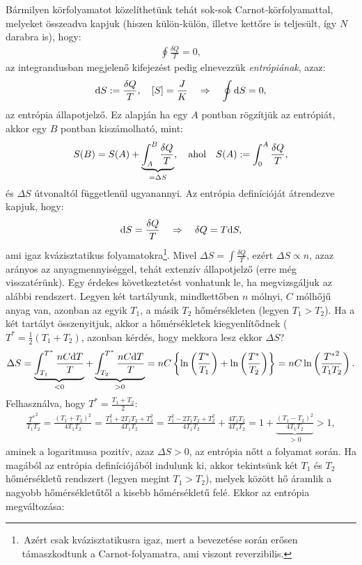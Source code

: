 Bármilyen körfolyamatot közelíthetünk tehát sok-sok Carnot-körfolyamattal, melyeket összeadva kapjuk (hiszen külön-külön, illetve kettőre is teljesült, így $N$ darabra is), hogy:
\begin{align}
	\oint \frac{\delta Q}{T} = 0,
\end{align}
az integrandusban megjelenő kifejezést pedig elnevezzük \emph{entrópiának}, azaz:
\begin{align}
	\mathrm{d}S:= \frac{\delta Q}{T}, \quad [S]=\frac JK \quad\Rightarrow\quad \oint \mathrm{d}S = 0,
\end{align}
az entrópia állapotjelző. Ez alapján ha egy $A$ pontban rögzítjük az entrópiát, akkor egy $B$ pontban kiszámolható, mint:
\begin{align}
	S(B) = S(A) + \underbrace{\int_A^B\frac{\delta Q}{T}}_{=\Delta S},\quad\textnormal{ahol}\quad S(A):=\int_0^A\dfrac{\delta Q}{T},
\end{align}
és $\Delta S$ útvonaltól függetlenül ugyanannyi. Az entrópia definícióját átrendezve kapjuk, hogy:
\begin{align}
	\mathrm{d}S = \frac{\delta Q}{T} \quad\Rightarrow\quad \delta Q = T\mathrm{d}S,
\end{align}
ami igaz kvázisztatikus folyamatokra\footnote{\,Azért csak kvázisztatikusra igaz, mert a bevezetése során erősen támaszkodtunk a Carnot-folyamatra, ami viszont reverzibilis.}. Mivel $\Delta S = \int \frac{\delta Q}{T}$, ezért $\Delta S \propto n$, azaz arányos az anyagmennyiséggel, tehát extenzív állapotjelző (erre még visszatérünk).
Egy érdekes következtetést vonhatunk le, ha megvizsgáljuk az alábbi rendszert. Legyen két tartályunk, mindkettőben $n$ mólnyi, $C$ mólhőjű anyag van, azonban az egyik $T_1$, a másik $T_2$ hőmérsékleten (legyen $T_1>T_2$). Ha a két tartályt összenyitjuk, akkor a hőmérsékletek kiegyenlítődnek ($T^* = \frac 12(T_1+T_2)$, azonban kérdés, hogy mekkora lesz ekkor $\Delta S$?
\begin{align}
	\Delta S = \underbrace{\int_{T_1}^{T^*}\frac{nC\mathrm{d}T}{T}}_{<0} + \underbrace{\int_{T_2}^{T^*}\frac{nC\mathrm{d}T}{T}}_{>0} = nC\left\{{\ln\left({\frac{T^*}{T_1}}\right)+\ln\left({\frac{T^*}{T_2}}\right)}\right\} = nC\ln\left({\frac{{T^*}^2}{T_1T_2}}\right).
\end{align}
Felhasználva, hogy $T^* = \frac{T_1+T_2}{2}$:
\begin{align}
	\frac{{T^*}^2}{T_1T_2}=\frac{(T_1{+}T_2)^2}{4T_1T_2} {=} \frac{T_1^2{+}2T_1T_2{+}T_2^2}{4T_1T_2} {=} \frac{T_1^2{-}2T_1T_2{+}T_2^2}{4T_1T_2} {+} \frac{4T_1T_2}{4T_1T_2} {=} 1{+}\underbrace{\frac{(T_1{-}T_2)^2}{4T_1T_2}}_{>0}>1,
\end{align}
aminek a logaritmusa pozitív, azaz $\Delta S>0$, az entrópia nőtt a folyamat során. Ha magából az entrópia definíciójából indulunk ki, akkor tekintsünk két $T_1$ és $T_2$ hőmérsékletű rendszert (legyen megint $T_1>T_2$), melyek között hő áramlik a nagyobb hőmérsékletűtől a kisebb hőmérsékletű felé. Ekkor az entrópia megváltozása:
